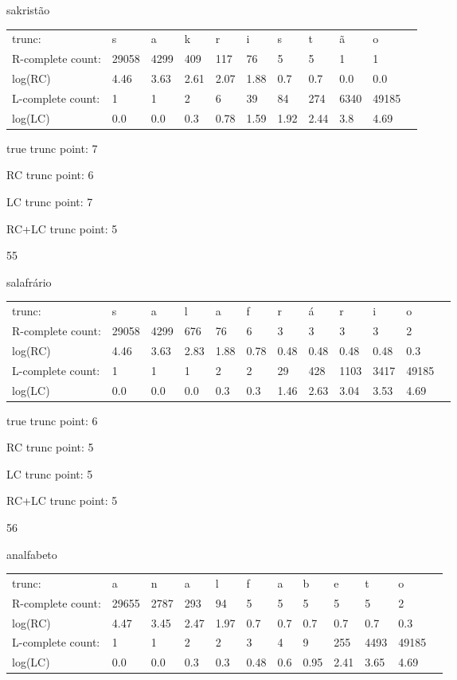 \documentclass{article}
\begin{document}
sakristão

\begin{tabular}{l|llllllllll}
trunc: & s & a & k & r & i & s & t & ã & o & \\ 
R-complete count: & 29058 & 4299 & 409 & 117 & 76 & 5 & 5 & 1 & 1 & \\ 
log(RC) & 4.46 & 3.63 & 2.61 & 2.07 & 1.88 & 0.7 & 0.7 & 0.0 & 0.0 & \\ 
L-complete count: & 1 & 1 & 2 & 6 & 39 & 84 & 274 & 6340 & 49185 & \\ 
log(LC) & 0.0 & 0.0 & 0.3 & 0.78 & 1.59 & 1.92 & 2.44 & 3.8 & 4.69 & \\ 
\end{tabular}

true trunc point: 7

RC trunc point: 6

LC trunc point: 7

RC+LC trunc point: 5

\vspace{1em}

55

salafrário

\begin{tabular}{l|lllllllllll}
trunc: & s & a & l & a & f & r & á & r & i & o & \\ 
R-complete count: & 29058 & 4299 & 676 & 76 & 6 & 3 & 3 & 3 & 3 & 2 & \\ 
log(RC) & 4.46 & 3.63 & 2.83 & 1.88 & 0.78 & 0.48 & 0.48 & 0.48 & 0.48 & 0.3 & \\ 
L-complete count: & 1 & 1 & 1 & 2 & 2 & 29 & 428 & 1103 & 3417 & 49185 & \\ 
log(LC) & 0.0 & 0.0 & 0.0 & 0.3 & 0.3 & 1.46 & 2.63 & 3.04 & 3.53 & 4.69 & \\ 
\end{tabular}

true trunc point: 6

RC trunc point: 5

LC trunc point: 5

RC+LC trunc point: 5

\vspace{1em}

56

analfabeto

\begin{tabular}{l|lllllllllll}
trunc: & a & n & a & l & f & a & b & e & t & o & \\ 
R-complete count: & 29655 & 2787 & 293 & 94 & 5 & 5 & 5 & 5 & 5 & 2 & \\ 
log(RC) & 4.47 & 3.45 & 2.47 & 1.97 & 0.7 & 0.7 & 0.7 & 0.7 & 0.7 & 0.3 & \\ 
L-complete count: & 1 & 1 & 2 & 2 & 3 & 4 & 9 & 255 & 4493 & 49185 & \\ 
log(LC) & 0.0 & 0.0 & 0.3 & 0.3 & 0.48 & 0.6 & 0.95 & 2.41 & 3.65 & 4.69 & \\ 
\end{tabular}
\end{document}
